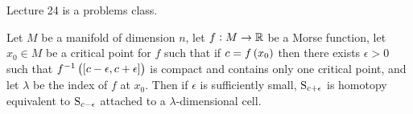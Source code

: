 
Lecture 24 is a problems class.


\begin{theorem}
\label{thm:3.22}
Let $ M $ be a manifold of dimension $ n $, let $ f : M \to \RR $ be a Morse function, let $ x_0 \in M $ be a critical point for $ f $ such that if $ c = f\br{x_0} $ then there exists $ \epsilon > 0 $ such that $ f^{-1}\br{\sbr{c - \epsilon, c + \epsilon}} $ is compact and contains only one critical point, and let $ \lambda $ be the index of $ f $ at $ x_0 $. Then if $ \epsilon $ is sufficiently small, $ \S_{c + \epsilon} $ is homotopy equivalent to $ \S_{c - \epsilon} $ attached to a $ \lambda $-dimensional cell.
\end{theorem}

